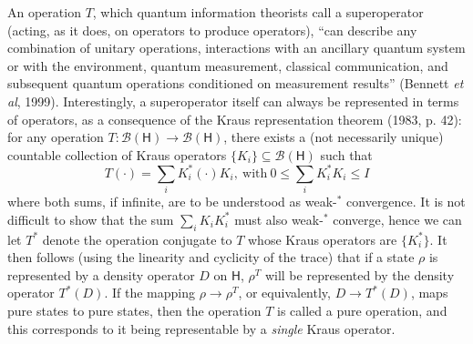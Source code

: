 \documentclass[12pt]{article}
\newcommand{\alg}[1]{\mbox{$\mathcal{#1}$}}
\newcommand{\hil}[1]{\mbox{$\mathsf{#1}$}}
\begin{document}
An operation $T$, which quantum 
information theorists  
call a superoperator (acting, as it does, on operators to 
produce operators), ``can describe any 
combination of unitary operations, interactions with an ancillary 
quantum system or with the environment, quantum measurement, 
classical communication, and subsequent quantum operations 
conditioned on measurement results'' (Bennett \emph{et al}, 1999).  
Interestingly, a superoperator itself can always be represented in terms of 
operators, as 
a consequence of the Kraus representation theorem (1983, p. 42): 
for any operation $T:\alg{B}(\hil{H})\rightarrow\alg{B}(\hil{H})$, 
there exists a (not necessarily unique) countable collection of 
Kraus operators $\{K_{i}\}\subseteq\alg{B}(\hil{H})$ such that
\begin{equation} \label{eq:Kraus}
      T(\cdot)=\sum_{i}K_{i}^{*}(\cdot)K_{i},\ \mbox{with}\ 
      0\leq \sum_{i}K_{i}^{*}K_{i}\leq I
      \end{equation}
      where both sums, if infinite, are to be understood as  
      weak-$^{*}$ convergence.  It is not difficult to show that the sum 
      $\sum_{i}K_{i}K_{i}^{*}$ must also weak-$^{*}$ converge, hence we 
      can let $T^{*}$ denote the operation conjugate to $T$ whose Kraus 
      operators are $\{K_{i}^{*}\}$.  It then follows (using the 
      linearity and cyclicity of the trace) that
       if a state $\rho$ is represented by a density operator $D$ on 
       $\hil{H}$, 
      $\rho^{T}$ will be represented by the density operator $T^{*}(D)$.
      If the mapping $\rho\rightarrow\rho^{T}$, or equivalently, 
      $D\rightarrow T^{*}(D)$, maps pure states to pure states, then 
      the operation $T$ is called a pure operation, and this 
      corresponds to it being representable by a \emph{single} Kraus operator.      
            
\end{document}
